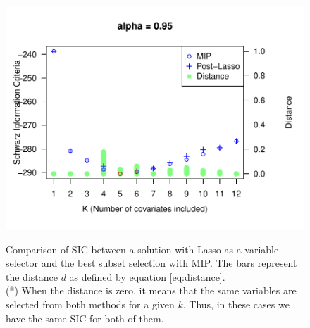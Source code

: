 \begin{figure}
\begin{minipage}[t]{0.4\linewidth}
\begin{minipage}[b]{\linewidth}
      \centering     \includegraphics[width=\textwidth]{Figuras/SIC095.pdf}
      \label{fig:npqar-cross}
     \end{minipage}
  \end{minipage}
  \caption{Comparison of SIC between a solution with Lasso as a variable selector and the best subset selection with MIP. The bars represent the distance $d$ as defined by equation \ref{eq:distance}. \\ (*) When the distance is zero, it means that the same variables are selected from both methods for a given $k$. Thus, in these cases we have the same SIC for both of them.}
  \label{fig:comparison-lm-results}
\end{figure}
